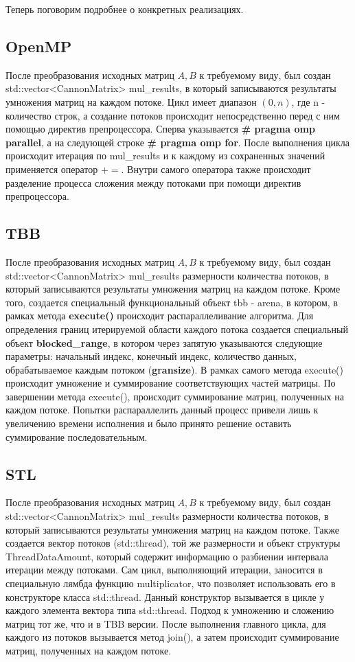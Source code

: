 \documentclass[12pt]{article}
\begin{document}
Теперь поговорим подробнее о конкретных реализациях. \\
\subsection{OpenMP}
После преобразования исходных матриц $A, B$ к требуемому виду, был создан std::vector<CannonMatrix> mul\_results, в который записываются результаты умножения матриц на каждом потоке. Цикл имеет диапазон $(0, n)$, где n - количество строк, а создание потоков происходит непосредственно перед с ним помощью директив препроцессора. Сперва указывается \textbf{\# pragma omp parallel}, а на следующей строке \textbf{\# pragma omp for}. После выполнения цикла происходит итерация по mul\_results и к каждому из сохраненных значений применяется оператор $+=$. Внутри самого оператора также происходит разделение процесса сложения между потоками при помощи директив препроцессора. 
\newpage
\subsection{TBB}
После преобразования исходных матриц $A, B$ к требуемому виду, был создан std::vector<CannonMatrix> mul\_results размерности количества потоков, в который записываются результаты умножения матриц на каждом потоке. Кроме того, создается специальный функциональный объект tbb - arena, в котором, в рамках метода \textbf{execute()} происходит распараллеливание алгоритма. Для определения границ итерируемой области каждого потока создается специальный объект \textbf{blocked\_range}, в котором через запятую указываются следующие параметры: начальный индекс, конечный индекс, количество данных, обрабатываемое каждым потоком (\textbf{gransize}). В рамках самого метода execute() происходит умножение и суммирование соответствующих частей матрицы. По завершении метода execute(), происходит суммирование матриц, полученных на каждом потоке. Попытки распараллелить данный процесс привели лишь к увеличению времени исполнения и было принято решение оставить суммирование последовательным.  

\subsection{STL}
После преобразования исходных матриц $A, B$ к требуемому виду, был создан std::vector<CannonMatrix> mul\_results размерности количества потоков, в который записываются результаты умножения матриц на каждом потоке. Также создается вектор потоков (std::thread), той же размерности и объект структуры ThreadDataAmount, который содержит информацию о разбиении интервала итерации между потоками. Сам цикл, выполняющий итерации, заносится в специальную лямбда функцию multiplicator, что позволяет использовать его в конструкторе класса std::thread. Данный конструктор вызывается в цикле у каждого элемента вектора типа std::thread. Подход к умножению и сложению матриц тот же, что и в TBB версии. После выполнения главного цикла, для каждого из потоков вызывается метод join(), а затем происходит суммирование матриц, полученных на каждом потоке. 
\newpage
\end{document}

